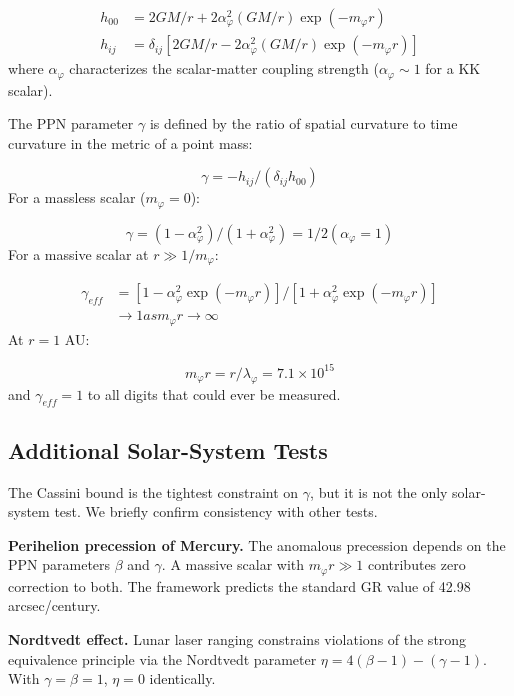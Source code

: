 \documentclass[aps,prd,preprint,superscriptaddress,longbibliography,floatfix]{revtex4-2}
\theoremstyle{remark}
\begin{document}
\begin{align}
    h_{00} &= 2GM/r + 2 \alpha_\varphi^{2} (GM/r) \exp(-m_\varphi r) \\
    h_{ij} &= \delta_{ij} [ 2GM/r - 2 \alpha_\varphi^{2} (GM/r) \exp(-m_\varphi r) ]
\end{align}
where $\alpha_\varphi$ characterizes the scalar-matter coupling strength ($\alpha_\varphi \sim  1$ for a KK scalar).

The PPN parameter $\gamma$ is defined by the ratio of spatial curvature to time curvature in the metric of a point mass:


\begin{equation}
    \gamma = - h_{ij} / (\delta_{ij} h_{00})
\end{equation}
For a massless scalar ($m_\varphi = 0$):


\begin{equation}
    \gamma = (1 - \alpha_\varphi^{2}) / (1 + \alpha_\varphi^{2}) = 1/2   (\alpha_\varphi = 1)
\end{equation}
For a massive scalar at $r \gg 1/m_\varphi$:


\begin{align}
    \gamma_{eff} &= [1 - \alpha_\varphi^{2} \exp(-m_\varphi r)] / [1 + \alpha_\varphi^{2} \exp(-m_\varphi r)] \\
    & \to 1   as   m_\varphi r \to \infty
\end{align}
At $r = 1$ AU:


\begin{equation}
    m_\varphi r = r / \lambda_\varphi = 7.1 \times 10^{15}
\end{equation}
and $\gamma_{eff} = 1$ to all digits that could ever be measured.



\subsection{Additional Solar-System Tests}

The Cassini bound is the tightest constraint on $\gamma$, but it is not the only solar-system test. We briefly confirm consistency with other tests.

\textbf{Perihelion precession of Mercury.} The anomalous precession depends on the PPN parameters $\beta$ and $\gamma$. A massive scalar with $m_\varphi r \gg 1$ contributes zero correction to both. The framework predicts the standard GR value of 42.98 arcsec/century.

\textbf{Nordtvedt effect.} Lunar laser ranging constrains violations of the strong equivalence principle via the Nordtvedt parameter $\eta = 4(\beta - 1) - (\gamma - 1)$. With $\gamma = \beta = 1$, $\eta = 0$ identically.
\end{document}
